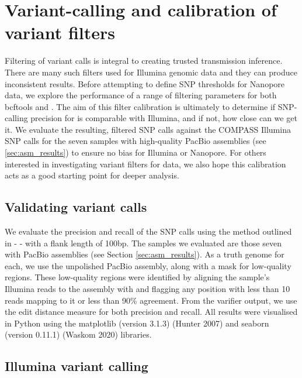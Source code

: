 \section{Variant-calling and calibration of \ont{} variant filters}
\label{sec:var-calls}

Filtering of variant calls is integral to creating trusted transmission
inference. There are many such filters used for Illumina genomic data
and they can produce inconsistent results\cite{walter2020}. Before
attempting to define SNP thresholds for Nanopore data, we explore the
performance of a range of filtering parameters for both bcftools and \pandora{}.  
The aim of this filter calibration is ultimately to determine if SNP-calling precision for \ont{} is comparable with Illumina, and if not, how close can we get it.
We evaluate the resulting, filtered SNP calls
against the COMPASS Illumina SNP calls for the seven
samples with high-quality PacBio assemblies (see \autoref{sec:asm_results}) to ensure no bias for
Illumina or Nanopore.
For others interested in investigating variant filters for \ont{} data, we also hope this calibration acts as a good starting point for deeper analysis.

\subsection{Validating variant calls}

We evaluate the precision and recall of the SNP calls using the method outlined in  -  - with a flank length of 100bp. The samples we evaluated are those seven with PacBio assemblies (see Section \autoref{sec:asm_results}). As a truth genome for each, we use the unpolished  PacBio assembly, along with a mask for low-quality regions. These low-quality regions were identified by aligning the sample's Illumina reads to the assembly with  and flagging any position with less than 10 reads mapping to it or less than 90\% agreement. From the varifier output, we use the edit distance measure for both precision and recall. All results were visualised in Python using the matplotlib (version 3.1.3) (Hunter 2007) and seaborn (version 0.11.1) (Waskom 2020) libraries.

\subsection{Illumina variant calling}


